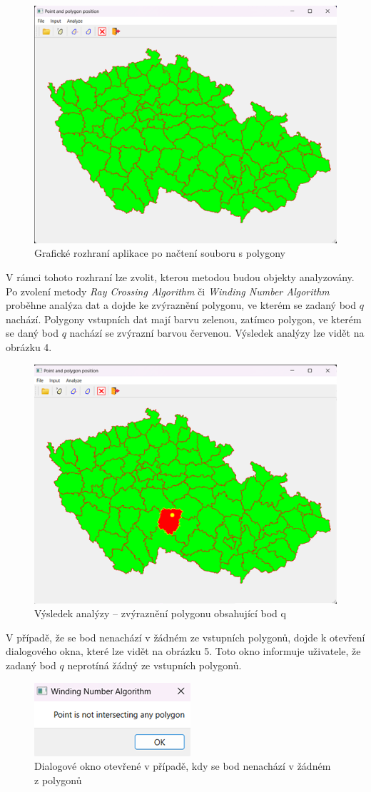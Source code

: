 \documentclass{article}
\begin{document}
\begin{spacing}{1.5}
\begin{figure}[h]
    \centering
    \includegraphics[width=0.62\linewidth]{images/app01.png}
    \caption{Grafické rozhraní aplikace po načtení souboru s polygony}
    \label{fig:enter-labe}
\end{figure}

V rámci tohoto rozhraní lze zvolit, kterou metodou budou objekty analyzovány. Po zvolení metody \textit{Ray Crossing Algorithm} či \textit{Winding Number Algorithm} proběhne analýza dat a dojde ke zvýraznění polygonu, ve kterém se zadaný bod $q$ nachází. Polygony vstupních dat mají barvu zelenou, zatímco polygon, ve kterém se daný bod $q$ nachází se zvýrazní barvou červenou. Výsledek analýzy lze vidět na obrázku 4.

\begin{figure}[h]
    \centering
    \includegraphics[width=0.62\linewidth]{images/app02.png}
    \caption{Výsledek analýzy – zvýraznění polygonu obsahující bod q}
    \label{fig:enter-label}
\end{figure}
V případě, že se bod nenachází v žádném ze vstupních polygonů, dojde k otevření dialogového okna, které lze vidět na obrázku 5. Toto okno informuje uživatele, že zadaný bod $q$ neprotíná žádný ze vstupních polygonů. 

\begin{figure}[h]
    \centering
    \includegraphics[width=0.3\linewidth]{images/app03.png}
    \caption{Dialogové okno otevřené v případě, kdy se bod nenachází v žádném z polygonů}
    \label{fig:enter-label}
\end{figure}


\end{spacing}
\end{document}

